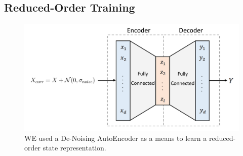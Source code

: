 \documentclass[letterpaper, 10 pt, conference]{ieeeconf}
\begin{document}
\subsection{Reduced-Order Training}

\begin{figure}[ht]
    \centering
    \includegraphics[width=\linewidth]{fig-autoencoder}
    \caption{
        WE used a De-Noising AutoEncoder as a means to learn a reduced-order state representation.
    }
    \label{fig:autoencoder}
\end{figure}

\lipsum[1-9]
\end{document}
